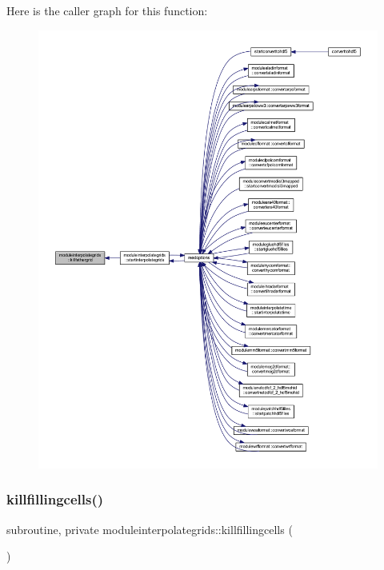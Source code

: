 Here is the caller graph for this function\+:\nopagebreak
\begin{figure}[H]
\begin{center}
\leavevmode
\includegraphics[width=350pt]{namespacemoduleinterpolategrids_a697db5b73722dba5d0ff54b8ac62f66a_icgraph}
\end{center}
\end{figure}
\mbox{\label{namespacemoduleinterpolategrids_ab2c9728a897c55e3db86eb34edf09800}} 
\subsubsection{\texorpdfstring{killfillingcells()}{killfillingcells()}}
{\footnotesize\ttfamily subroutine, private moduleinterpolategrids\+::killfillingcells (\begin{DoxyParamCaption}{ }\end{DoxyParamCaption})\hspace{0.3cm}{\ttfamily [private]}}

